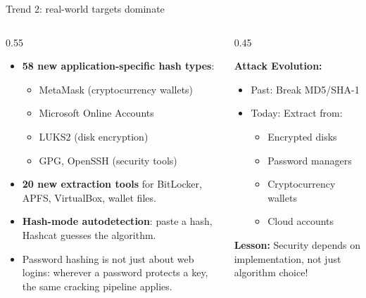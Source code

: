\ifdefined\PRESENTATION\else\PassOptionsToClass{handout}{beamer}\fi\documentclass[aspectratio=169, lualatex]{beamer}
\begin{document}
\begin{frame}{Trend 2: real-world targets dominate}
	\begin{columns}[c]
		\begin{column}{0.55\textwidth}
			\begin{itemize}
				\item \textbf{58 new application-specific hash types}:
				      \begin{itemize}
					      \item MetaMask (cryptocurrency wallets)
					      \item Microsoft Online Accounts
					      \item LUKS2 (disk encryption)
					      \item GPG, OpenSSH (security tools)
				      \end{itemize}
				\item \textbf{20 new extraction tools} for BitLocker, APFS, VirtualBox, wallet files.
				\item \textbf{Hash-mode autodetection}: paste a hash, Hashcat guesses the algorithm.
				\item Password hashing is not just about web logins: wherever a password protects a key, the same cracking pipeline applies.
			\end{itemize}
		\end{column}
		\begin{column}{0.45\textwidth}
			\begin{tcolorbox}[colback=black!5!white,colframe=ciphergray]
				\textbf{Attack Evolution:}
				\begin{itemize}
					\item Past: Break MD5/SHA-1
					\item Today: Extract from:
					      \begin{itemize}
						      \small
						      \item Encrypted disks
						      \item Password managers
						      \item Cryptocurrency wallets
						      \item Cloud accounts
					      \end{itemize}
				\end{itemize}
				\textcolor{cipherprimary}{\textbf{Lesson:} \small Security depends on implementation, not just algorithm choice!}
			\end{tcolorbox}
		\end{column}
	\end{columns}
\end{frame}
\end{document}
